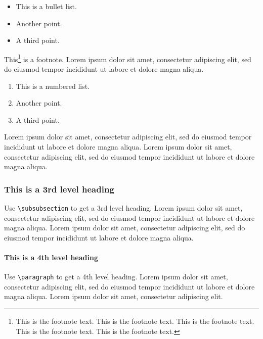 \documentclass[a4paper,num-refs]{ehi-journals}
\begin{document}
\begin{itemize}
\item This is a bullet list.
\item Another point.
\item A third point.
\end{itemize}

This\footnote{This is the footnote text. This is the footnote text. This is the footnote text. This is the footnote text. This is the footnote text.} is a footnote. Lorem ipsum dolor sit amet, consectetur adipiscing elit, sed do eiusmod tempor incididunt ut labore et dolore magna aliqua.

\begin{enumerate}[label=\arabic*)]
\item This is a numbered list.
\item Another point.
\item A third point.
\end{enumerate}

Lorem ipsum dolor sit amet, consectetur adipiscing elit, sed do eiusmod tempor incididunt ut labore et dolore magna aliqua. Lorem ipsum dolor sit amet, consectetur adipiscing elit, sed do eiusmod tempor incididunt ut labore et dolore magna aliqua.


\subsubsection{This is a 3rd level heading}

Use \verb|\subsubsection| to get a 3rd level heading.
Lorem ipsum dolor sit amet, consectetur adipiscing elit, sed do eiusmod tempor incididunt ut labore et dolore magna aliqua. Lorem ipsum dolor sit amet, consectetur adipiscing elit, sed do eiusmod tempor incididunt ut labore et dolore magna aliqua. 


\paragraph{This is a 4th level heading}

Use \verb|\paragraph| to get a 4th level heading.
Lorem ipsum dolor sit amet, consectetur adipiscing elit, sed do eiusmod tempor incididunt ut labore et dolore magna aliqua. Lorem ipsum dolor sit amet, consectetur adipiscing elit. 
\end{document}
